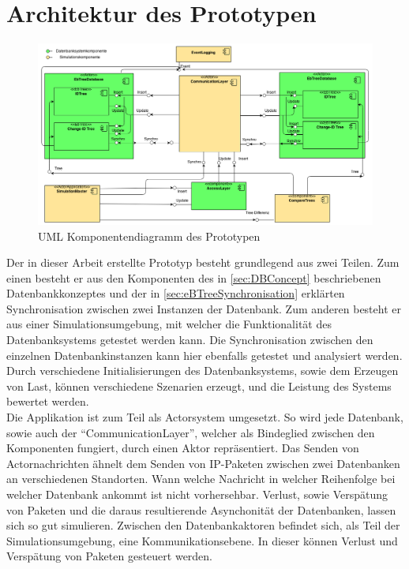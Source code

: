 \documentclass[a4paper,11pt,oneside,%
headsepline,												%
footsepline,												%
bibtotocnumbered									%
]{scrreprt}
\begin{document}
\section{Architektur des Prototypen}
\begin{figure}[h!]
  \begin{center}
    \includegraphics[width=1.0\linewidth]{bilder/prototyp_component_diagram.png}
  \end{center}
 \caption{UML Komponentendiagramm des Prototypen}
\end{figure}
Der in dieser Arbeit erstellte Prototyp besteht grundlegend aus zwei Teilen. Zum einen besteht er aus den Komponenten des in \autoref{sec:DBConcept} beschriebenen Datenbankkonzeptes und der in \autoref{sec:eBTreeSynchronisation} erklärten Synchronisation zwischen zwei Instanzen der Datenbank. Zum anderen besteht er aus  einer Simulationsumgebung, mit welcher die Funktionalität des Datenbanksystems getestet werden kann. Die Synchronisation zwischen den einzelnen Datenbankinstanzen kann hier ebenfalls getestet und analysiert werden. Durch verschiedene Initialisierungen des Datenbanksystems, sowie dem Erzeugen von Last,  können verschiedene Szenarien erzeugt, und die Leistung des Systems bewertet werden. \\
Die Applikation ist zum Teil als Actorsystem umgesetzt. So wird jede Datenbank, sowie auch der \enquote{CommunicationLayer}, welcher als Bindeglied zwischen den Komponenten fungiert, durch einen Aktor repräsentiert.
Das Senden von Actornachrichten ähnelt dem Senden von IP-Paketen zwischen zwei Datenbanken an verschiedenen Standorten. Wann welche Nachricht in welcher Reihenfolge bei welcher Datenbank ankommt ist nicht vorhersehbar. Verlust, sowie Verspätung von Paketen und die daraus resultierende Asynchonität der Datenbanken, lassen sich so gut simulieren.
Zwischen den Datenbankaktoren befindet sich, als Teil der Simulationsumgebung, eine Kommunikationsebene. In dieser können Verlust und Verspätung von Paketen gesteuert werden.
\end{document}
